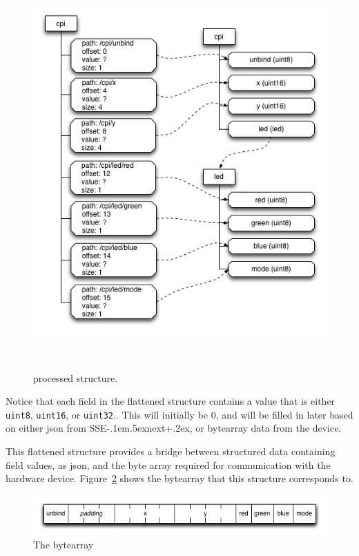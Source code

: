 \documentclass[12pt]{article}
\def\SSEnext{SSE\kern-.1em\lower.5ex\hbox{\footnotesize next}\kern+.2ex}
\begin{document}
\begin{figure}[htbp] %
   \centering
   \includegraphics[height=6in]{flat_structure.png} 
\caption{processed structure.}
\label{fig:flattened}
\end{figure}

Notice that each field in the flattened structure contains a value
that is either \verb|uint8|, \verb|uint16|, or \verb|uint32|..
This will initially be 0, and will be filled in later based on either json
from \SSEnext, or bytearray data from the device.

This flattened structure provides a bridge between structured data
containing field values, as json, and the byte array required for
communication with the hardware device. Figure~\ref{fig:bytearray}
shows the bytearray that this structure corresponds to.

\begin{figure}[htbp] %
   \centering
   \includegraphics[width=6in]{bytearray.png} 
\caption{The bytearray}
\label{fig:bytearray}
\end{figure}
\end{document}
